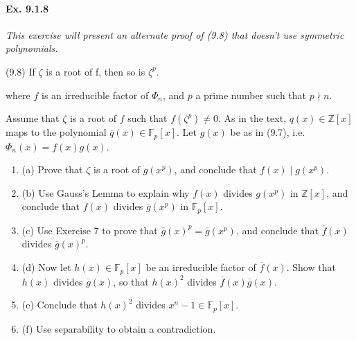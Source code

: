 \documentclass[11pt,a4paper]{article}
\newcommand{\be} {\begin{enumerate}}
\newcommand{\ee} {\end{enumerate}}
\newcommand{\Z}{\mathbb{Z}}
\newcommand{\F}{\mathbb{F}}
\begin{document}
\paragraph{Ex. 9.1.8}

{\it This exercise will present an alternate proof of (9.8) that doesn't use symmetric polynomials.  \begin{center}
(9.8) \qquad If $\zeta$ is a root of f, then so is $\zeta^p$.
\end{center}
where $f$ is an irreducible factor of $\Phi_n$, and $p$ a prime number such that $p\nmid n$.

Assume that $\zeta$ is a root of $f$ such that $f(\zeta^p) \ne 0$.
As in the text, $q(x) \in \Z[x]$ maps to the polynomial $\overline{q}(x) \in \F_p[x]$. Let $g(x)$ be as in (9.7), i.e. $\Phi_n(x) = f(x) g(x)$.
\be
\item[(a)] Prove that $\zeta$ is a root of $g(x^p)$, and conclude that $f(x) \mid g(x^p)$.
\item[(b)] Use Gauss's Lemma to explain why $f(x)$ divides $g(x^p)$ in $\Z[x]$, and conclude that $\overline{f}(x)$ divides $\overline{g}(x^p)$ in $\F_p[x]$.
\item[(c)] Use Exercise 7 to prove that $\overline{g}(x)^p = \overline{g}(x^p)$, and conclude that $\overline{f}(x)$ divides $\overline{g}(x)^p$.
\item[(d)] Now let $h(x) \in \F_p[x]$ be an irreducible factor of $\overline{f}(x)$. Show that $h(x)$ divides $\overline{g}(x)$, so that $h(x)^2$ divides $\overline{f}(x) \overline{g}(x)$.
\item[(e)] Conclude that $h(x)^2$ divides $x^n-1 \in \F_p[x]$.
\item[(f)] Use separability to obtain a contradiction.
\ee

}
\end{document}
